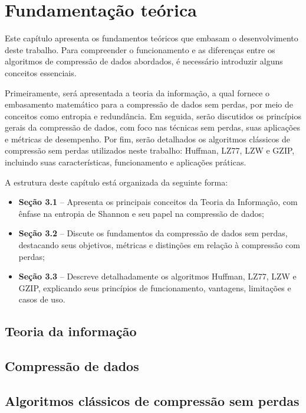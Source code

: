 \chapter{Fundamentação teórica}
\label{c.fundamentacao_teorica}

Este capítulo apresenta os fundamentos teóricos que embasam o desenvolvimento deste trabalho. Para compreender o funcionamento e as diferenças entre os algoritmos de compressão de dados abordados, é necessário introduzir alguns conceitos essenciais.

Primeiramente, será apresentada a teoria da informação, a qual fornece o embasamento matemático para a compressão de dados sem perdas, por meio de conceitos como entropia e redundância. Em seguida, serão discutidos os princípios gerais da compressão de dados, com foco nas técnicas sem perdas, suas aplicações e métricas de desempenho. Por fim, serão detalhados os algoritmos clássicos de compressão sem perdas utilizados neste trabalho: Huffman, LZ77, LZW e GZIP, incluindo suas características, funcionamento e aplicações práticas.

A estrutura deste capítulo está organizada da seguinte forma:

\begin{itemize}
    \item \textbf{Seção 3.1} -- Apresenta os principais conceitos da Teoria da Informação, com ênfase na entropia de Shannon e seu papel na compressão de dados;
    \item \textbf{Seção 3.2} -- Discute os fundamentos da compressão de dados sem perdas, destacando seus objetivos, métricas e distinções em relação à compressão com perdas;
    \item \textbf{Seção 3.3} -- Descreve detalhadamente os algoritmos Huffman, LZ77, LZW e GZIP, explicando seus princípios de funcionamento, vantagens, limitações e casos de uso.
\end{itemize}

\section{Teoria da informação}

\section{Compressão de dados}

\section{Algoritmos clássicos de compressão sem perdas}

